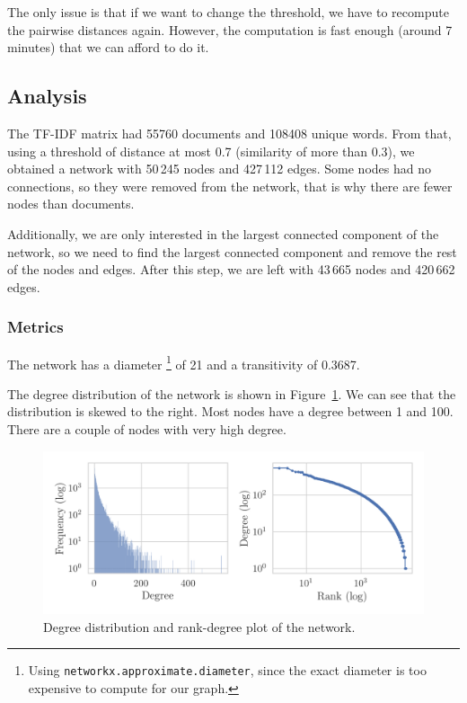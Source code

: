 The only issue is that if we want to change the threshold, we have to recompute
the pairwise distances again. However, the computation is fast enough (around 7 minutes)
that we can afford to do it.

\subsection{Analysis}

The TF-IDF matrix had 55760 documents and 108408 unique words. From that, using a threshold
of distance at most 0.7 (similarity of more than 0.3), we obtained a network
with 50\,245 nodes and 427\,112 edges.
Some nodes had no connections, so they were removed from the network, that is why there
are fewer nodes than documents.

Additionally, we are only interested in the largest connected component of the network, so we
need to find the largest connected component and remove the rest of the nodes and edges. After
this step, we are left with 43\,665 nodes and 420\,662 edges.

\subsubsection{Metrics}

The network has a diameter%
\footnote{Using \texttt{networkx.approximate.diameter}, since the exact diameter is too expensive to compute for our graph.}
of 21 and a transitivity of 0.3687.

The degree distribution of the network is shown in Figure~\ref{fig:degree_dist}. We can see that
the distribution is skewed to the right. Most nodes have a degree between 1 and 100. There are
a couple of nodes with very high degree.

\begin{figure}[H]
	\includegraphics{figures/degree_joint.png}
	\caption{Degree distribution and rank-degree plot of the network.}%
	\label{fig:degree_dist}
\end{figure}

